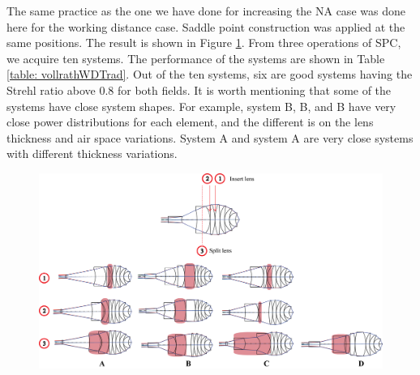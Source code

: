 The same practice as the one we have done for increasing the NA case was done here for the working distance case. Saddle point construction was applied at the same positions. The result is shown in Figure \ref{fig: vollrathWDSPC}. From three operations of SPC, we acquire ten systems. The performance of the systems are shown in Table \ref{table: vollrathWDTrad}. Out of the ten systems, six are good systems having the Strehl ratio above 0.8 for both fields. It is worth mentioning that some of the systems have close system shapes. For example, system B, B, and B have very close power distributions for each element, and the different is on the lens thickness and air space variations. System A and system A are very close systems with different thickness variations. 

\begin{figure}[h!]
    \centering
    \includegraphics[width=\textwidth]{chapter-4/figures/vollrathWDSPC.png}
    \caption{}
    \label{fig: vollrathWDSPC}
\end{figure}

